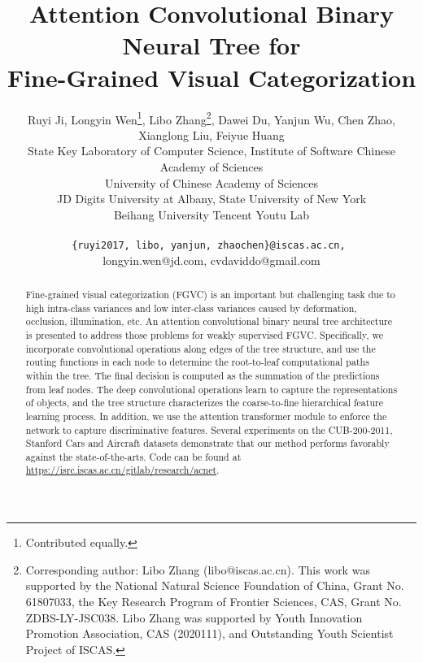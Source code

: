 \documentclass[10pt,twocolumn,letterpaper]{article}
\begin{document}
	
\title{Attention Convolutional Binary Neural Tree for \\ Fine-Grained Visual Categorization}

\author{Ruyi Ji, Longyin Wen\thanks{Contributed equally.}, Libo Zhang\thanks{Corresponding author: Libo Zhang (libo@iscas.ac.cn). This work was supported by the National Natural Science Foundation of China, Grant No. 61807033, the Key Research Program of Frontier Sciences, CAS, Grant No. ZDBS-LY-JSC038. Libo Zhang was supported by Youth Innovation Promotion Association, CAS (2020111), and Outstanding Youth Scientist Project of ISCAS.}, Dawei Du, \authorcr Yanjun Wu, Chen Zhao, Xianglong Liu, Feiyue Huang\\
State Key Laboratory of Computer Science, Institute of Software Chinese Academy of Sciences\\University of Chinese Academy of Sciences\\JD Digits \quad University at Albany, State University of New York\\Beihang University \quad Tencent Youtu Lab\\{\tt\small \{ruyi2017, libo, yanjun, zhaochen\}@iscas.ac.cn, \par longyin.wen@jd.com, cvdaviddo@gmail.com}}


\maketitle


\begin{abstract}
Fine-grained visual categorization (FGVC) is an important but challenging task due to high intra-class variances and low inter-class variances caused by deformation, occlusion, illumination, etc. An attention convolutional binary neural tree architecture is presented to address those problems for weakly supervised FGVC. Specifically, we incorporate convolutional operations along edges of the tree structure, and use the routing functions in each node to determine the root-to-leaf computational paths within the tree. The final decision is computed as the summation of the predictions from leaf nodes. The deep convolutional operations learn to capture the representations of objects, and the tree structure characterizes the coarse-to-fine hierarchical feature learning process. In addition, we use the attention transformer module to enforce the network to capture discriminative features. Several experiments on the CUB-200-2011, Stanford Cars and Aircraft datasets demonstrate that our method performs favorably against the state-of-the-arts. Code can be found
at \url{https://isrc.iscas.ac.cn/gitlab/research/acnet}.
\end{abstract}
\end{document}
